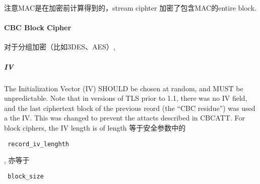 \documentclass[a4paper]{ctexart}
\begin{document}
注意MAC是在加密前计算得到的，stream ciphter 加密了包含MAC的entire block.

\paragraph{CBC Block Cipher}

对于分组加密（比如3DES、AES）, 

\subparagraph{IV}
The Initialization Vector (IV) SHOULD be chosen at random, and MUST be unpredictable. Note that in versions of TLS prior to 1.1,
there was no IV field, and the last ciphertext block of the previous reord (the ``CBC residue'') was used a the IV. This was 
changed to prevent the attacts described in CBCATT. For block ciphers, the IV length is of length 等于安全参数中的 \begin{verbatim} record_iv_lenghth \end{verbatim},
亦等于\begin{verbatim} block_size \end{verbatim}
\end{document}
